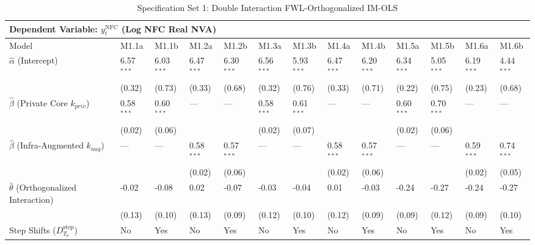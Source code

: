 \begin{table}[H]
\centering
\caption{Specification Set 1: Double Interaction FWL-Orthogonalized IM-OLS}
\label{tab:spec_set_1}
\setlength{\tabcolsep}{2.5pt}
\scriptsize
\begin{tabular}{p{3.2cm}p{1.1cm}p{1.1cm}p{1.1cm}p{1.1cm}p{1.1cm}p{1.1cm}p{1.1cm}p{1.1cm}p{1.1cm}p{1.1cm}p{1.1cm}p{1.1cm}}
\toprule
\multicolumn{13}{l}{\textbf{Dependent Variable: $y_t^{\text{NFC}}$ (Log NFC Real NVA)}} \\
\midrule
Model & M1.1a & M1.1b & M1.2a & M1.2b & M1.3a & M1.3b & M1.4a & M1.4b & M1.5a & M1.5b & M1.6a & M1.6b  \\
\midrule
$\hat{\alpha}$ (Intercept)  & 6.57$^{***}$ & 6.03$^{***}$ & 6.47$^{***}$ & 6.30$^{***}$ & 6.56$^{***}$ & 5.93$^{***}$ & 6.47$^{***}$ & 6.20$^{***}$ & 6.34$^{***}$ & 5.05$^{***}$ & 6.19$^{***}$ & 4.44$^{***}$  \\
 & {\scriptsize (0.32)} & {\scriptsize (0.73)} & {\scriptsize (0.33)} & {\scriptsize (0.68)} & {\scriptsize (0.32)} & {\scriptsize (0.76)} & {\scriptsize (0.33)} & {\scriptsize (0.71)} & {\scriptsize (0.22)} & {\scriptsize (0.75)} & {\scriptsize (0.23)} & {\scriptsize (0.68)}  \\
$\hat{\beta}$ (Private Core $k_{priv}$)  & 0.58$^{***}$ & 0.60$^{***}$ & --- & --- & 0.58$^{***}$ & 0.61$^{***}$ & --- & --- & 0.60$^{***}$ & 0.70$^{***}$ & --- & ---  \\
 & {\scriptsize (0.02)} & {\scriptsize (0.06)} &  &  & {\scriptsize (0.02)} & {\scriptsize (0.07)} &  &  & {\scriptsize (0.02)} & {\scriptsize (0.06)} &  &   \\
$\hat{\beta}$ (Infra-Augmented $k_{aug}$)  & --- & --- & 0.58$^{***}$ & 0.57$^{***}$ & --- & --- & 0.58$^{***}$ & 0.57$^{***}$ & --- & --- & 0.59$^{***}$ & 0.74$^{***}$  \\
 &  &  & {\scriptsize (0.02)} & {\scriptsize (0.06)} &  &  & {\scriptsize (0.02)} & {\scriptsize (0.06)} &  &  & {\scriptsize (0.02)} & {\scriptsize (0.05)}  \\
$\hat{\theta}$ (Orthogonalized Interaction)  & -0.02 & -0.08 & 0.02 & -0.07 & -0.03 & -0.04 & 0.01 & -0.03 & -0.24 & -0.27 & -0.24 & -0.27  \\
 & {\scriptsize (0.13)} & {\scriptsize (0.10)} & {\scriptsize (0.13)} & {\scriptsize (0.09)} & {\scriptsize (0.12)} & {\scriptsize (0.10)} & {\scriptsize (0.12)} & {\scriptsize (0.09)} & {\scriptsize (0.09)} & {\scriptsize (0.12)} & {\scriptsize (0.09)} & {\scriptsize (0.10)}  \\
Step Shifts ($D^{\text{step}}_{T_b}$)  & No & Yes & No & Yes & No & Yes & No & Yes & No & Yes & No & Yes  \\

\end{tabular}
\end{table}

